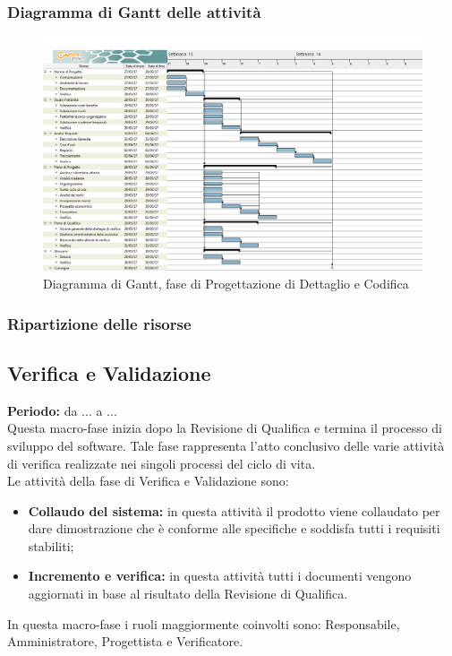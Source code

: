 	\subsubsection{Diagramma di Gantt delle attività}
	\begin{figure}[H]
		\centering
		\includegraphics[scale=0.30]{immagini/gantt/progettazione_dettaglio_codifica.png}
		\caption{Diagramma di Gantt, fase di Progettazione di Dettaglio e Codifica}
	\end{figure}
	\subsubsection{Ripartizione delle risorse}
	\subsection{Verifica e Validazione}
	\textbf{Periodo:} da ... a ... \\
	Questa macro-fase inizia dopo la Revisione di Qualifica e termina il processo di sviluppo del software. Tale fase rappresenta l'atto conclusivo delle varie attività di verifica realizzate nei singoli processi del ciclo di vita. \\
	Le attività della fase di Verifica e Validazione sono: \\
	\begin{itemize}
		\item \textbf{Collaudo del sistema:} in questa attività il prodotto viene collaudato per dare
dimostrazione che è conforme alle specifiche e soddisfa tutti i requisiti stabiliti; \\
		\item \textbf{Incremento e verifica:} in questa attività tutti i documenti vengono aggiornati in base al risultato della Revisione di Qualifica. \\
	\end{itemize}
	In questa macro-fase i ruoli maggiormente coinvolti sono: Responsabile, Amministratore, Progettista e Verificatore.
